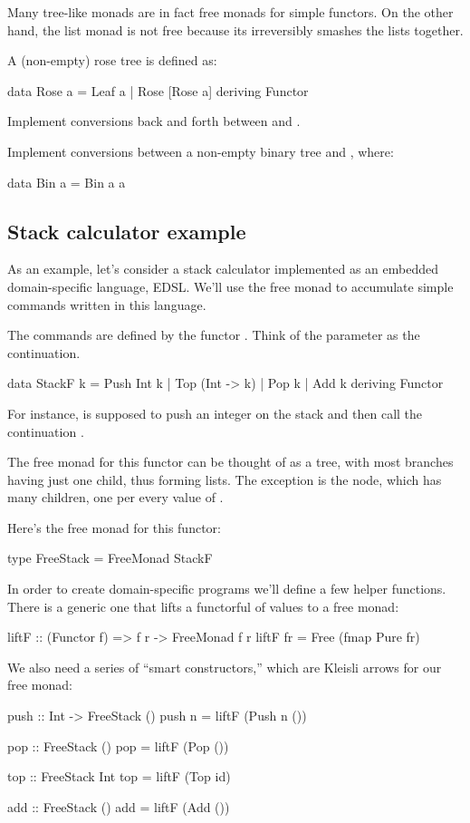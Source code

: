 \documentclass[DaoFP]{subfiles}
\begin{document}
Many tree-like monads are in fact free monads for simple functors. On the other hand, the list monad is not free because its  irreversibly smashes the lists together.

\begin{exercise}
A (non-empty) rose tree is defined as:
\begin{haskell}
data Rose a = Leaf a | Rose [Rose a]
  deriving Functor
\end{haskell}
Implement conversions back and forth between  and  .
\end{exercise}

\begin{exercise}
Implement conversions between a non-empty binary tree and , where:
\begin{haskell}
data Bin a = Bin a a
\end{haskell}
\end{exercise}

\subsection{Stack calculator example}
As an example, let's consider a stack calculator implemented as an embedded domain-specific language, EDSL. We'll use the free monad to accumulate simple commands written in this language. 

The commands are defined by the functor . Think of the parameter   as the continuation. 
\begin{haskell}
data StackF k  = Push Int k
               | Top (Int -> k)
               | Pop k            
               | Add k
               deriving Functor
\end{haskell}
For instance,  is supposed to push an integer on the stack and then call the continuation .

The free monad for this functor can be thought of as a tree, with most branches having just one child, thus forming lists. The exception is the  node, which has many children, one per every value of .

Here's the free monad for this functor:
\begin{haskell}
type FreeStack = FreeMonad StackF
\end{haskell}

In order to create domain-specific programs we'll define a few helper functions. There is a generic one that lifts a functorful of values to a free monad:
\begin{haskell} 
liftF :: (Functor f) => f r -> FreeMonad f r
liftF fr = Free (fmap Pure fr)
\end{haskell}
We also need a series of ``smart constructors,'' which are Kleisli arrows for our free monad:
\begin{haskell}
push :: Int -> FreeStack ()
push n = liftF (Push n ())

pop :: FreeStack ()
pop = liftF (Pop ())

top :: FreeStack Int
top = liftF (Top id)

add :: FreeStack ()
add = liftF (Add ())
\end{haskell}
\end{document}
